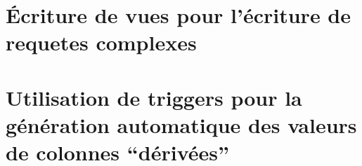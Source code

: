 \documentclass[12pt,a4paper,openany]{article}
\begin{document}
	\maketitle
	\section{Écriture de vues pour l'écriture de requetes complexes}
	
	\section{Utilisation de triggers pour la génération automatique des valeurs de colonnes ``dérivées''}
	
	
\end{document}
